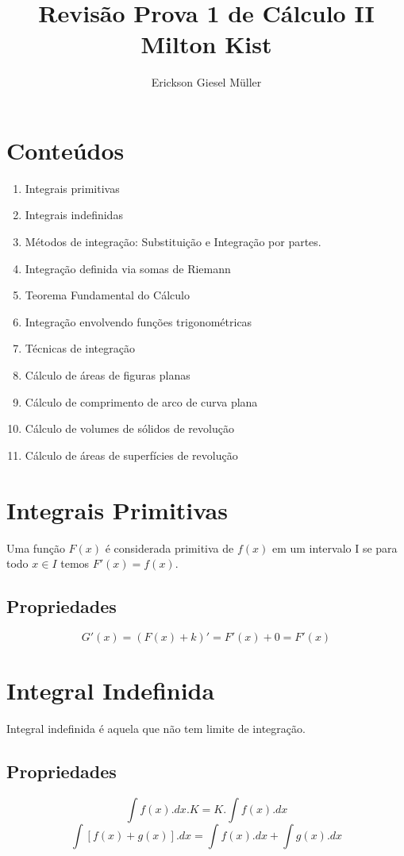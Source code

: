 \documentclass{article}
\title{Revisão Prova 1 de Cálculo II\\Milton Kist}
\author{Erickson Giesel Müller}
\begin{document}
	\maketitle
	
	\section{Conteúdos}
		\begin{enumerate}
			\item Integrais primitivas
			\item Integrais indefinidas
			\item Métodos de integração: Substituição e Integração por partes.
			\item Integração definida via somas de Riemann
			\item Teorema Fundamental do Cálculo
			\item Integração envolvendo funções trigonométricas
			\item Técnicas de integração
			\item Cálculo de áreas de figuras planas
			\item Cálculo de comprimento de arco de curva plana
			\item Cálculo de volumes de sólidos de revolução
			\item Cálculo de áreas de superfícies de revolução
		\end{enumerate}
	\newpage
	\section{Integrais Primitivas}
		Uma função $F(x)$ é considerada primitiva de $f(x)$ em um intervalo I se para todo $x \in I$ temos $F'(x)=f(x)$.
		\subsection{Propriedades}
			$$G'(x)=(F(x)+k)' = F'(x)+0=F'(x)$$
	\section{Integral Indefinida}
		Integral indefinida é aquela que não tem limite de integração.
		\subsection{Propriedades}
			\begin{equation}
			\int f(x).dx.K = K.\int f(x).dx
			\end{equation}
			\begin{equation}
			\int [f(x)+g(x)].dx = \int f(x).dx + \int g(x).dx
			\end{equation}
\end{document}
